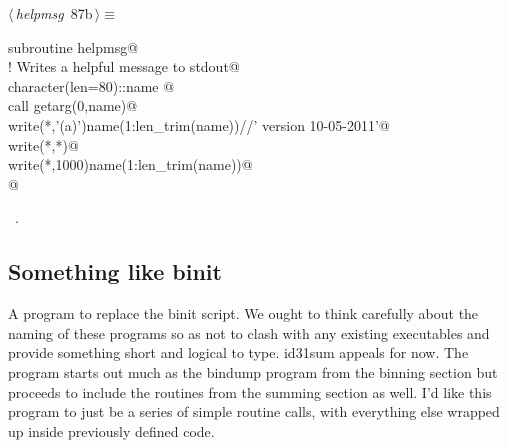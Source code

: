 \documentclass[10pt,a4paper,notitlepage]{article}
\begin{document}
\begin{flushleft} \small
\begin{minipage}{\linewidth}\label{scrap111}\raggedright\small
{} $\langle\,${\it helpmsg}\nobreak\ {\footnotesize {87b}}$\,\rangle\equiv$
\vspace{-1ex}
\begin{list}{}{} \item
\mbox{}\verb@      subroutine helpmsg@\\
\mbox{}\verb@! Writes a helpful message to stdout@\\
\mbox{}\verb@      character(len=80)::name      @\\
\mbox{}\verb@      call getarg(0,name)@\\
\mbox{}\verb@      write(*,'(a)')name(1:len_trim(name))//' version 10-05-2011'@\\
\mbox{}\verb@      write(*,*)@\\
\mbox{}\verb@      write(*,1000)name(1:len_trim(name))@\\
\mbox{}\verb@                                                                        @{\NWsep}
\end{list}
\vspace{-1.5ex}
\footnotesize
\begin{list}{}{\setlength{\itemsep}{-\parsep}\setlength{\itemindent}{-\leftmargin}}
\item \NWtxtMacroRefIn\ .

\item{}
\end{list}
\end{minipage}\vspace{4ex}
\end{flushleft}
\subsection{Something like binit}
A program to replace the binit script. We ought to think carefully about the 
naming of these programs so as not to clash with any existing executables and
provide something short and logical to type. id31sum appeals for now. The
program starts out much as the bindump program from the binning section
but proceeds to include the routines from the summing section as well.
I'd like this program to just be a series of simple routine calls,
with everything else wrapped up inside previously defined code.
\end{document}
